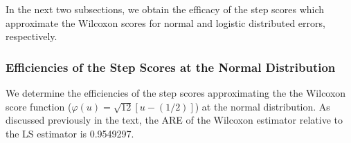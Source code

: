 %
In the next two subsections, we obtain the efficacy of the step scores which approximate
the Wilcoxon scores for normal and logistic distributed errors, respectively.

\subsubsection{Efficiencies of the Step Scores at the Normal Distribution}
\label{asyeffnorm}
We determine the efficiencies of the step scores approximating the
the Wilcoxon score function ($\varphi(u) = \sqrt{12}[u-(1/2)]$) at the normal distribution.
As discussed previously in the text, the ARE of the Wilcoxon
estimator relative to the LS estimator is 0.9549297.


